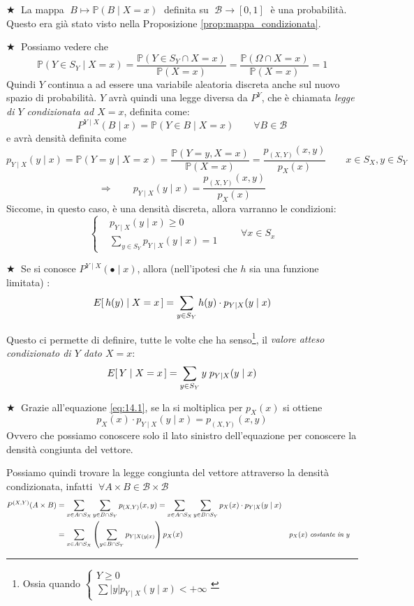 \bigskip
\noindent \(\bigstar \;\) La mappa $\;B\mapsto\mathbb{P}(B\mid X=x)\;$ definita su $\;\mathcal{B}\to [0, 1]\;$ è una probabilità. Questo era già stato visto nella Proposizione \ref{prop:mappa_condizionata}.

\bigskip
\noindent \(\bigstar \;\) Possiamo vedere che
\[\mathbb{P}(Y\in S_Y\mid X=x) = \frac{\mathbb{P}(Y\in S_Y\cap X=x)}{\mathbb{P}(X=x)} = \frac{\mathbb{P}(\Omega \cap X=x)}{\mathbb{P}(X=x)} = 1\]
Quindi $Y$ continua a ad essere una variabile aleatoria discreta anche sul nuovo spazio di probabilità. $Y$ avrà quindi una legge diversa da $P^Y$, che è chiamata \textit{legge di $Y$ condizionata ad $X=x$}, definita come:
\[P^{Y\mid X}(B \mid x) = \mathbb{P}(Y\in B\mid X=x)\qquad \forall B\in \mathcal{B}\]
e avrà densità definita come
\[p_{Y\mid X}(y\mid x) = \mathbb{P}(Y=y\mid X=x) = \frac{\mathbb{P}(Y=y, X=x)}{\mathbb{P}(X=x)} = \frac{p_{(X, Y)}(x, y)}{p_X(x)}\qquad  x\in S_X, y\in S_Y\]
\begin{equation}
    \label{eq:14.1}
    \Rightarrow\qquad \boxed{p_{Y\mid X}(y\mid x) = \frac{p_{(X, Y)}(x, y)}{p_X(x)} }
\end{equation}
Siccome, in questo caso, è una densità discreta, allora varranno le condizioni:
\[\begin{cases}
    & p_{Y\mid X}(y\mid x) \geq 0\\
    & \sum_{y\in S_Y} p_{Y\mid X} (y\mid x) = 1 
\end{cases}\qquad \forall x \in S_x\]

\bigskip
\noindent \(\bigstar \;\) Se si conosce $P^{Y\mid X}(\bullet \mid x)$, allora (nell'ipotesi che $h$ sia una funzione limitata) :
\[E\!\left[\,h(y)\mid X=x\,\right] = \sum_{y\in S_Y} h(y)\cdot p_{Y\mid X}(y\mid x)\]

Questo ci permette di definire, tutte le volte che ha senso\footnote{Ossia quando $\begin{cases}
    Y\geq 0\\
    \sum |y| p_{Y\mid X}(y\mid x) < +\infty
\end{cases}$}, il \textit{valore atteso condizionato di $Y$ dato $X=x$}:
\[E\!\left[\,Y\mid X=x\,\right] = \sum_{y\in S_Y} y \;p_{Y\mid X}(y\mid x)\]

\bigskip
\noindent \(\bigstar \;\) Grazie all'equazione \ref{eq:14.1}, se la si moltiplica per $p_X(x)$ si ottiene
\[p_X(x)\cdot p_{Y\mid X}(y\mid x) = p_{(X, Y)}(x, y)\]
\noindent Ovvero che possiamo conoscere solo il lato sinistro dell'equazione per conoscere la densità congiunta del vettore. 

\medskip
\noindent Possiamo quindi trovare la legge congiunta del vettore attraverso la densità condizionata, infatti $\;\forall A\times B \in \mathcal{B}\times\mathcal{B}$
\begin{align*}
    P^{(X, Y)}(A\times B)&  = \sum_{x\in A\cap S_X} \sum_{y\in B\cap S_Y} p_{(X, Y)}(x, y) = \sum_{x\in A\cap S_X} \sum_{y\in B\cap S_Y} p_X(x)\cdot p_{Y\mid X}(y\mid x)\\
    & = \sum_{x\in A\cap S_X}\left(\sum_{y\in B\cap S_Y}p_{Y\mid X(y\mid x)}\right) p_X(x) && \textit{\small$p_X(x)$ costante in $y$}
\end{align*}

